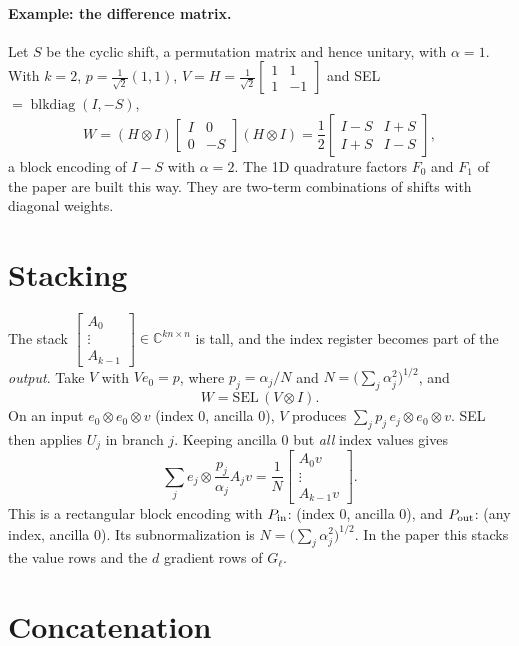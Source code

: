 \documentclass[11pt,a4paper]{article}
\newcommand{\C}{\mathbb{C}}
\begin{document}
\paragraph{Example: the difference matrix.} Let $S$ be the cyclic shift, a
permutation matrix and hence unitary, with $\alpha=1$. With $k=2$, $p=\frac1{\sqrt2}(1,1)$,
$V=H=\frac1{\sqrt2}\begin{bmatrix}1&1\\1&-1\end{bmatrix}$ and SEL $=\operatorname{blkdiag}(I,-S)$,
\[
W=(H\otimes I)\begin{bmatrix}I&0\\0&-S\end{bmatrix}(H\otimes I)=\frac12\begin{bmatrix}I-S&I+S\\I+S&I-S\end{bmatrix},
\]
a block encoding of $I-S$ with $\alpha=2$. The 1D quadrature factors $F_0$ and $F_1$
of the paper are built this way. They are two-term combinations of shifts
with diagonal weights.

\section{Stacking}

The stack $\begin{bmatrix}A_0\\ \vdots\\ A_{k-1}\end{bmatrix}\in\C^{kn\times n}$ is tall, and the index
register becomes part of the \emph{output}. Take $V$ with $Ve_0=p$, where
$p_j=\alpha_j/N$ and $N=\big(\sum_j\alpha_j^2\big)^{1/2}$, and
\[
W=\mathrm{SEL}\,(V\otimes I).
\]
On an input $e_0\otimes e_0\otimes v$ (index $0$, ancilla $0$), $V$ produces
$\sum_jp_j\,e_j\otimes e_0\otimes v$. SEL then applies $U_j$ in branch $j$. Keeping
ancilla $0$ but \emph{all} index values gives
\[
\sum_je_j\otimes\frac{p_j}{\alpha_j}A_jv=\frac1N\begin{bmatrix}A_0v\\ \vdots\\ A_{k-1}v\end{bmatrix}.
\]
This is a rectangular block encoding with $P_{\rm in}$: (index $0$, ancilla $0$), and
$P_{\rm out}$: (any index, ancilla $0$). Its subnormalization is
$N=\big(\sum_j\alpha_j^2\big)^{1/2}$. In the paper this stacks the value rows and
the $d$ gradient rows of $G_\ell$.

\section{Concatenation}
\end{document}
